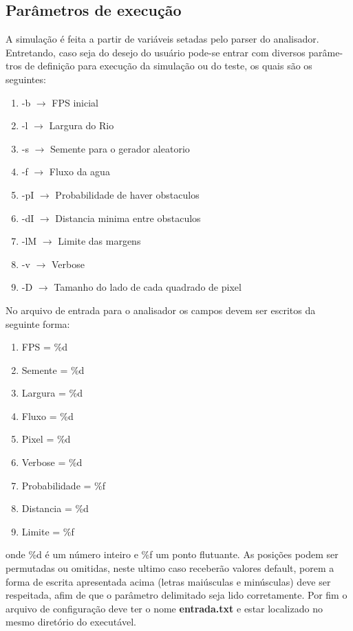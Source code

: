 \documentclass[a4paper,11pt]{article}
\begin{document}
\subsection{Parâmetros de execu\c{c}ão}
A simula\c{c}ão é feita a partir de variáveis setadas pelo parser do analisador. Entretando, caso seja do desejo do usuário pode-se entrar com diversos parâme-tros de defini\c{c}ão para execu\c{c}ão da simula\c{c}ão ou do teste, os quais são os seguintes:
\begin{enumerate}
\item[]{-b  $\rightarrow$ FPS inicial}
\item[]{-l  $\rightarrow$ Largura do Rio}
\item[]{-s  $\rightarrow$ Semente para o gerador aleatorio}
\item[]{-f  $\rightarrow$ Fluxo da agua}
\item[]{-pI $\rightarrow$ Probabilidade de haver obstaculos}
\item[]{-dI $\rightarrow$ Distancia minima entre obstaculos}
\item[]{-lM $\rightarrow$ Limite das margens}
\item[]{-v  $\rightarrow$ Verbose}
\item[]{-D  $\rightarrow$ Tamanho do lado de cada quadrado de pixel}
\end{enumerate}
No arquivo de entrada para o analisador os campos devem ser escritos da seguinte forma:
\begin{enumerate}
\item[]{FPS = \%d}
\item[]{Semente = \%d}
\item[]{Largura = \%d}
\item[]{Fluxo = \%d}
\item[]{Pixel = \%d}
\item[]{Verbose = \%d}
\item[]{Probabilidade = \%f}
\item[]{Distancia = \%d}
\item[]{Limite = \%f}
\end{enumerate}
onde \%d é um número inteiro e \%f um ponto flutuante. As posi\c{c}ões podem ser permutadas ou omitidas, neste ultimo caso receberão valores default, porem a forma de escrita apresentada acima (letras maiúsculas e minúsculas) deve ser respeitada, afim de que o parâmetro delimitado seja lido corretamente. Por fim o arquivo de configura\c{c}ão deve ter o nome \textbf{entrada.txt} e estar localizado no mesmo diretório do executável.
\end{document}
